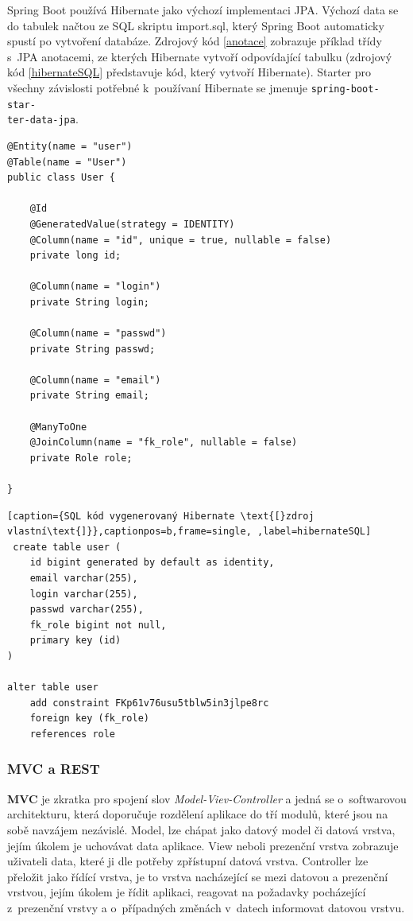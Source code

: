 Spring Boot používá Hibernate jako výchozí implementaci JPA. Výchozí data se do tabulek načtou ze SQL skriptu import.sql, který Spring Boot automaticky spustí po vytvoření databáze. Zdrojový kód \ref{anotace} zobrazuje příklad třídy s~JPA anotacemi, ze kterých Hibernate vytvoří odpovídající tabulku (zdrojový kód \ref{hibernateSQL} představuje kód, který vytvoří Hibernate). Starter pro všechny závislosti potřebné k~používaní Hibernate se jmenuje \texttt{spring-boot-star-\\ter-data-jpa}.



\begin{lstlisting}[caption={Třída s~anotacemi \text{[}zdroj vlastní\text{]}},captionpos=b,frame=single,label=anotace]
@Entity(name = "user")
@Table(name = "User")
public class User {

    @Id
    @GeneratedValue(strategy = IDENTITY)
    @Column(name = "id", unique = true, nullable = false)
    private long id;

    @Column(name = "login")
    private String login;

    @Column(name = "passwd")
    private String passwd;

    @Column(name = "email")
    private String email;

    @ManyToOne
    @JoinColumn(name = "fk_role", nullable = false)
    private Role role;

}
\end{lstlisting}

\begin{lstlisting}[caption={SQL kód vygenerovaný Hibernate \text{[}zdroj vlastní\text{]}},captionpos=b,frame=single, ,label=hibernateSQL]
 create table user (
    id bigint generated by default as identity,
    email varchar(255),
    login varchar(255),
    passwd varchar(255),
    fk_role bigint not null,
    primary key (id)
)
    
alter table user 
    add constraint FKp61v76usu5tblw5in3jlpe8rc 
    foreign key (fk_role) 
    references role
\end{lstlisting}

\subsubsection* {MVC a REST}

\textbf{MVC} je zkratka pro spojení slov \textit{Model-Viev-Controller} a jedná se o~softwarovou architekturu, která doporučuje rozdělení aplikace do tří modulů, které jsou na sobě navzájem nezávislé.  Model, lze chápat jako datový model či datová vrstva, jejím úkolem je uchovávat data aplikace. View neboli prezenční vrstva zobrazuje uživateli data, které ji dle potřeby zpřístupní datová vrstva. Controller lze přeložit jako řídící vrstva, je to vrstva nacházející se mezi datovou a prezenční vrstvou, jejím úkolem je řídit aplikaci, reagovat na požadavky pocházející z~prezenční vrstvy a o~případných změnách v~datech informovat datovou vrstvu. 

